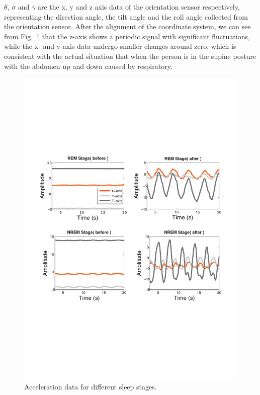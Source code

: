 $\theta$, $\sigma$ and $\gamma$ are the x, y and z axis data of the orientation sensor respectively, representing the direction angle, the tilt angle and the roll angle collected from the orientation sensor. After the alignment of the coordinate system, we can see from Fig.~\ref{fig:cordi} that the z-axis shows a periodic signal with significant fluctuations, while the x- and y-axis data undergo smaller changes around zero, which is consistent with the actual situation that when the person is in the supine posture with the abdomen up and down caused by respiratory.

 \begin{figure}[!t]
\centering
      \includegraphics[width=0.75\linewidth]{Figures/cordi.pdf}
  \caption{Acceleration data for different sleep stages.}\label{fig:cordi}
\end{figure}

